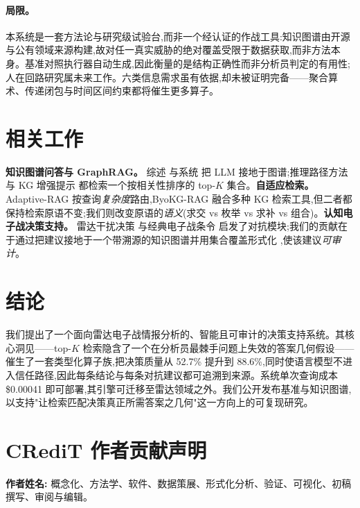 \documentclass[11pt,a4paper]{article}
\begin{document}
\paragraph{局限。}
本系统是一套方法论与研究级试验台,而非一个经认证的作战工具:知识图谱由开源与公有领域来源构建,故对任一真实威胁的绝对覆盖受限于数据获取,而非方法本身。基准对照执行器自动生成,因此衡量的是结构正确性而非分析员判定的有用性;人在回路研究属未来工作。六类信息需求虽有依据,却未被证明完备——聚合算术、传递闭包与时间区间约束都将催生更多算子。

\section{相关工作}
\label{sec:related}

\textbf{知识图谱问答与 GraphRAG。} 综述 \citep{peng2025graphrag} 与系统 \citep{edge2024graphrag,gutierrez2024hipporag} 把 LLM 接地于图谱;推理路径方法 \citep{luo2024rog,sun2024tog,ma2025tog2,jiang2023structgpt} 与 KG 增强提示 \citep{baek2023kaping} 都检索一个按相关性排序的 top-$K$ 集合。\textbf{自适应检索。} Adaptive-RAG \citep{jeong2024adaptiverag} 按查询\emph{复杂度}路由,ByoKG-RAG \citep{byokgrag2025} 融合多种 KG 检索工具,但二者都保持检索原语不变;我们则改变原语的\emph{语义}(求交 vs 枚举 vs 求补 vs 组合)。\textbf{认知电子战决策支持。} 雷达干扰决策 \citep{zhang2023cognitiveew} 与经典电子战条令 \citep{adamy2001ew101,schleher1999ew} 启发了对抗模块;我们的贡献在于通过把建议接地于一个带溯源的知识图谱并用集合覆盖形式化 \citep{chvatal1979setcover},使该建议\emph{可审计}。

\section{结论}
\label{sec:conclusion}

我们提出了一个面向雷达电子战情报分析的、智能且可审计的决策支持系统。其核心洞见——top-$K$ 检索隐含了一个在分析员最棘手问题上失效的答案几何假设——催生了一套类型化算子族,把决策质量从 52.7\% 提升到 88.6\%,同时使语言模型不进入信任路径,因此每条结论与每条对抗建议都可追溯到来源。系统单次查询成本 \$0.00041 即可部署,其引擎可迁移至雷达领域之外。我们公开发布基准与知识图谱,以支持"让检索匹配决策真正所需答案之几何"这一方向上的可复现研究。

\section*{CRediT 作者贡献声明}
\textbf{作者姓名:} 概念化、方法学、软件、数据策展、形式化分析、验证、可视化、初稿撰写、审阅与编辑。
\end{document}
